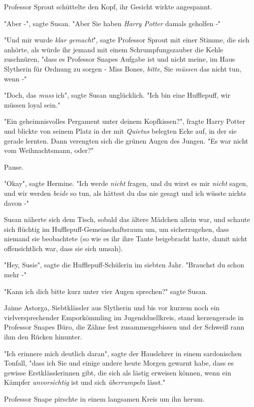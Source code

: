 {Professor Sprout schüttelte den Kopf, ihr Gesicht wirkte angespannt.

"Aber -", sagte Susan. "Aber Sie haben \emph{Harry Potter} damals geholfen -"

"Und mir wurde \emph{klar gemacht}", sagte Professor Sprout mit einer Stimme, die sich anhörte, als würde ihr jemand mit einem Schrumpfungszauber die Kehle zuschnüren, "dass es Professor Snapes Aufgabe ist und nicht meine, im Haus Slytherin für Ordnung zu sorgen - Miss Bones, \emph{bitte}, Sie \emph{müssen} das nicht tun, wenn -"

"Doch, das \emph{muss} ich", sagte Susan unglücklich. "Ich bin eine Hufflepuff, wir müssen loyal sein."

"Ein geheimnisvolles Pergament unter deinem Kopfkissen?", fragte Harry Potter und blickte von seinem Platz in der mit \emph{Quietus} belegten Ecke auf, in der sie gerade lernten. Dann verengten sich die grünen Augen des Jungen. "Es war nicht vom Weihnachtsmann, oder?"

Pause.

"Okay", sagte Hermine. "Ich werde \emph{nicht} fragen, und du wirst es mir \emph{nicht} sagen, und wir werden \emph{beide} so tun, als hättest du das nie gesagt und ich wüsste nichts davon -"

Susan näherte sich dem Tisch, sobald das ältere Mädchen allein war, und schaute sich flüchtig im Hufflepuff-Gemeinschaftsraum um, um sicherzugehen, dass niemand sie beobachtete (so wie es ihr ihre Tante beigebracht hatte, damit nicht offensichtlich war, dass sie sich umsah).

"Hey, Susie", sagte die Hufflepuff-Schülerin im siebten Jahr. "Brauchst du schon mehr -"

"Kann ich dich bitte kurz unter vier Augen sprechen?" sagte Susan.

Jaime Astorga, Siebtklässler aus Slytherin und bis vor kurzem noch ein vielversprechender Emporkömmling im Jugendduellkreis, stand kerzengerade in Professor Snapes Büro, die Zähne fest zusammengebissen und der Schweiß rann ihm den Rücken hinunter.

"Ich erinnere mich deutlich daran", sagte der Hauslehrer in einem sardonischen Tonfall, "dass ich Sie und einige andere heute Morgen gewarnt habe, dass es gewisse Erstklässlerinnen gibt, die sich als lästig erweisen können, wenn ein Kämpfer \emph{unvorsichtig} ist und sich \emph{überrumpeln} lässt."

Professor Snape pirschte in einem langsamen Kreis um ihn herum.

}
